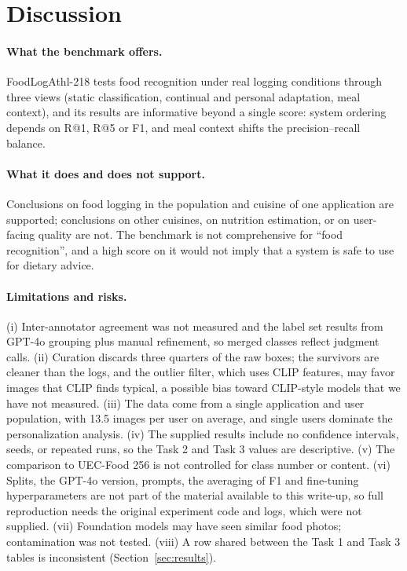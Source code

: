 \documentclass[sigconf, nonacm]{acmart}
\begin{document}
\section{Discussion}
\paragraph{What the benchmark offers.} FoodLogAthl-218 tests food recognition under real logging conditions through three views (static classification, continual and personal adaptation, meal context), and its results are informative beyond a single score: system ordering depends on R@1, R@5 or F1, and meal context shifts the precision--recall balance.

\paragraph{What it does and does not support.} Conclusions on food logging in the population and cuisine of one application are supported; conclusions on other cuisines, on nutrition estimation, or on user-facing quality are not. The benchmark is not comprehensive for ``food recognition'', and a high score on it would not imply that a system is safe to use for dietary advice.

\paragraph{Limitations and risks.} (i) Inter-annotator agreement was not measured and the label set results from GPT-4o grouping plus manual refinement, so merged classes reflect judgment calls. (ii) Curation discards three quarters of the raw boxes; the survivors are cleaner than the logs, and the outlier filter, which uses CLIP features, may favor images that CLIP finds typical, a possible bias toward CLIP-style models that we have not measured. (iii) The data come from a single application and user population, with 13.5 images per user on average, and single users dominate the personalization analysis. (iv) The supplied results include no confidence intervals, seeds, or repeated runs, so the Task 2 and Task 3 values are descriptive. (v) The comparison to UEC-Food 256 is not controlled for class number or content. (vi) Splits, the GPT-4o version, prompts, the averaging of F1 and fine-tuning hyperparameters are not part of the material available to this write-up, so full reproduction needs the original experiment code and logs, which were not supplied. (vii) Foundation models may have seen similar food photos; contamination was not tested. (viii) A row shared between the Task 1 and Task 3 tables is inconsistent (Section~\ref{sec:results}).
\end{document}
